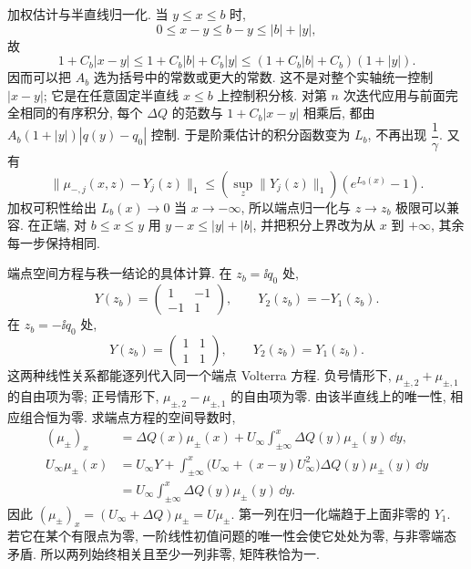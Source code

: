 \par\medskip\noindent 加权估计与半直线归一化.\quad
当 $y\le x\le b$ 时,
\begin{equation*}
0\le x-y\le b-y\le|b|+|y|,
\end{equation*}
故
\begin{equation*}
1+C_b|x-y|
\le 1+C_b|b|+C_b|y|
\le (1+C_b|b|+C_b)(1+|y|).
\end{equation*}
因而可以把 $A_b$ 选为括号中的常数或更大的常数.
这不是对整个实轴统一控制 $|x-y|$;
它是在任意固定半直线 $x\le b$ 上控制积分核.
对第 $n$ 次迭代应用与前面完全相同的有序积分,
每个 $\Delta Q$ 的范数与 $1+C_b|x-y|$ 相乘后,
都由 $A_b(1+|y|)|q(y)-q_0|$ 控制.
于是阶乘估计的积分函数变为 $L_b$, 不再出现 $\dfrac{1}{\gamma}$.
又有
\begin{equation*}
\|\mu_{-,j}(x,z)-Y_j(z)\|_1
\le\left(\sup\limits_z\|Y_j(z)\|_1\right)(e^{L_b(x)}-1).
\end{equation*}
加权可积性给出 $L_b(x)\to0$ 当 $x\to-\infty$,
所以端点归一化与 $z\to z_b$ 极限可以兼容.
在正端, 对 $b\le x\le y$ 用
$y-x\le |y|+|b|$, 并把积分上界改为从 $x$ 到 $+\infty$,
其余每一步保持相同.




\par\medskip\noindent 端点空间方程与秩一结论的具体计算.\quad
在 $z_b=\ii q_0$ 处,
\begin{equation*}
Y(z_b)=\begin{pmatrix}1&-1\\-1&1\end{pmatrix},
\qquad Y_2(z_b)=-Y_1(z_b).
\end{equation*}
在 $z_b=-\ii q_0$ 处,
\begin{equation*}
Y(z_b)=\begin{pmatrix}1&1\\1&1\end{pmatrix},
\qquad Y_2(z_b)=Y_1(z_b).
\end{equation*}
这两种线性关系都能逐列代入同一个端点 Volterra 方程.
负号情形下, $\mu_{\pm,2}+\mu_{\pm,1}$ 的自由项为零;
正号情形下, $\mu_{\pm,2}-\mu_{\pm,1}$ 的自由项为零.
由该半直线上的唯一性, 相应组合恒为零.
求端点方程的空间导数时,
\begin{align*}
(\mu_\pm)_x
&=\Delta Q(x)\mu_\pm(x)
+U_\infty\int_{\pm\infty}^{x}
\Delta Q(y)\mu_\pm(y)\,\dd y,\\
U_\infty\mu_\pm(x)
&=U_\infty Y
+\int_{\pm\infty}^{x}
\bigl(U_\infty+(x-y)U_\infty^2\bigr)
\Delta Q(y)\mu_\pm(y)\,\dd y\\
&=U_\infty\int_{\pm\infty}^{x}\Delta Q(y)\mu_\pm(y)\,\dd y.
\end{align*}
因此 $(\mu_\pm)_x=(U_\infty+\Delta Q)\mu_\pm=U\mu_\pm$.
第一列在归一化端趋于上面非零的 $Y_1$.
若它在某个有限点为零, 一阶线性初值问题的唯一性会使它处处为零,
与非零端态矛盾. 所以两列始终相关且至少一列非零, 矩阵秩恰为一.


